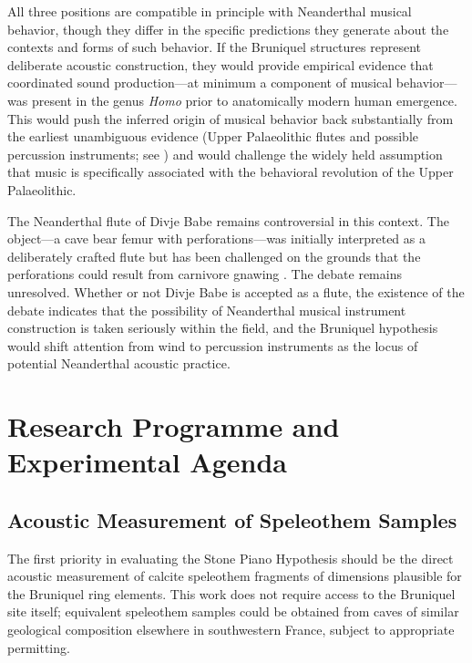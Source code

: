 \documentclass[12pt]{article}
\begin{document}
All three positions are compatible in principle with Neanderthal musical behavior, though they differ in the specific predictions they generate about the contexts and forms of such behavior. If the Bruniquel structures represent deliberate acoustic construction, they would provide empirical evidence that coordinated sound production—at minimum a component of musical behavior—was present in the genus \textit{Homo} prior to anatomically modern human emergence. This would push the inferred origin of musical behavior back substantially from the earliest unambiguous evidence (Upper Palaeolithic flutes and possible percussion instruments; see \citealt{Conard2009}) and would challenge the widely held assumption that music is specifically associated with the behavioral revolution of the Upper Palaeolithic.

The Neanderthal flute of Divje Babe remains controversial in this context. The object—a cave bear femur with perforations—was initially interpreted as a deliberately crafted flute \citep{Turk1997} but has been challenged on the grounds that the perforations could result from carnivore gnawing \citep{Chase1998}. The debate remains unresolved. Whether or not Divje Babe is accepted as a flute, the existence of the debate indicates that the possibility of Neanderthal musical instrument construction is taken seriously within the field, and the Bruniquel hypothesis would shift attention from wind to percussion instruments as the locus of potential Neanderthal acoustic practice.

\section{Research Programme and Experimental Agenda}

\subsection{Acoustic Measurement of Speleothem Samples}

The first priority in evaluating the Stone Piano Hypothesis should be the direct acoustic measurement of calcite speleothem fragments of dimensions plausible for the Bruniquel ring elements. This work does not require access to the Bruniquel site itself; equivalent speleothem samples could be obtained from caves of similar geological composition elsewhere in southwestern France, subject to appropriate permitting.
\end{document}
